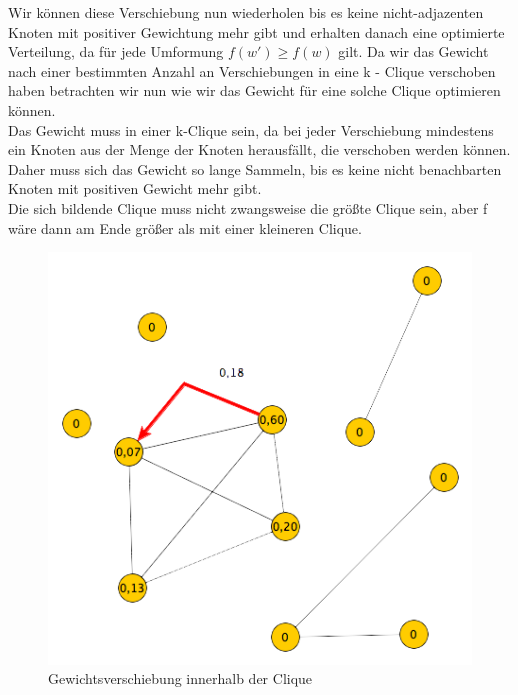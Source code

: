 \documentclass[12pt, a4paper]{article}
\begin{document}
Wir können diese Verschiebung nun wiederholen bis es keine nicht-adjazenten Knoten mit positiver Gewichtung mehr gibt und erhalten danach eine optimierte Verteilung, da für jede Umformung $f(w') \ge f(w)$ gilt. Da wir das Gewicht nach einer bestimmten Anzahl an Verschiebungen in eine k - Clique verschoben haben betrachten wir nun wie wir das Gewicht für eine solche Clique optimieren können. \\
Das Gewicht muss in einer k-Clique sein, da bei jeder Verschiebung mindestens ein Knoten aus der Menge der Knoten herausfällt, die verschoben werden können. Daher muss sich das Gewicht so lange Sammeln, bis es keine nicht benachbarten Knoten mit positiven Gewicht mehr gibt. \\
Die sich bildende Clique muss nicht zwangsweise die größte Clique sein, aber f wäre dann am Ende größer als mit einer kleineren Clique.

\begin{figure}[H] 
		\centering
		\includegraphics[page=1, width=\textwidth]{assets/proof3_before_first_moving_step}
		\caption{Gewichtsverschiebung innerhalb der Clique} 
\end{figure}
\end{document}
